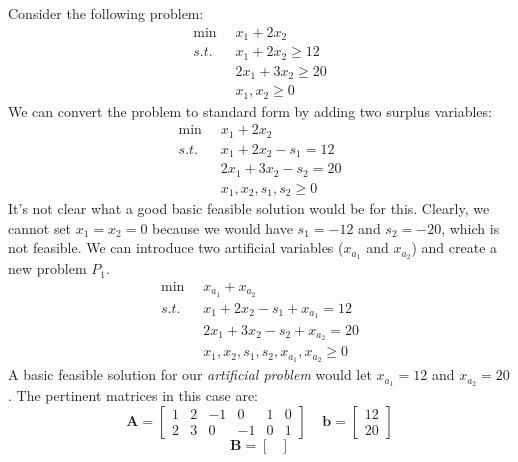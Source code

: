 \begin{example} Consider the following problem:
\begin{equation}
\begin{aligned}
\min\;\; & 	x_1 + 2x_2\\
s.t.\;\; &	x_1 + 2x_2 \geq 12\\
		 &	2x_1 + 3x_2 \geq 20\\
		 &	x_1, x_2 \geq 0
\end{aligned}
\end{equation}
We can convert the problem to standard form by adding two surplus variables:
\begin{equation}
\begin{aligned}
\min\;\; & 	x_1 + 2x_2\\
s.t.\;\; &	x_1 + 2x_2 - s_1  = 12\\
		 &	2x_1 + 3x_2 - s_2 = 20\\
		 &	x_1, x_2, s_1, s_2 \geq 0
\end{aligned}
\end{equation}
It's not clear what a good basic feasible solution would be for this. Clearly, we cannot set $x_1 = x_2 = 0$ because we would have $s_1 = -12$ and $s_2 = -20$, which is not feasible. We can introduce two artificial variables ($x_{a_1}$ and $x_{a_2}$) and create a new problem $P_1$. 
\begin{equation}
\begin{aligned}
\min\;\; & 	x_{a_1} + x_{a_2}\\
s.t.\;\; &	x_1 + 2x_2 - s_1  + x_{a_1} = 12\\
		 &	2x_1 + 3x_2 - s_2 + x_{a_2} = 20\\
		 &	x_1, x_2, s_1, s_2,x_{a_1},x_{a_2} \geq 0
\end{aligned}
\end{equation}
A basic feasible solution for our \textit{artificial problem} would let $x_{a_1} = 12$ and $x_{a_2} = 20$. The pertinent matrices in this case are:
\begin{displaymath}
\mathbf{A} = \begin{bmatrix}
1 & 2 & -1 & 0 & 1 & 0\\
2 & 3 & 0 & -1 & 0 & 1
\end{bmatrix}\;\;\;\;
\mathbf{b} = \begin{bmatrix}
12\\20
\end{bmatrix}
\end{displaymath}
\begin{displaymath}
\mathbf{B} = \begin{bmatrix}

\end{bmatrix}
\end{displaymath}
\end{example}
